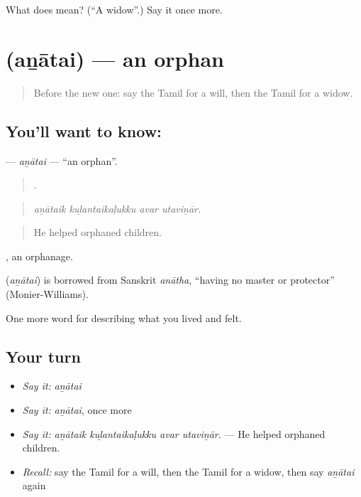 \begin{tcolorbox}[breakable,colback=teal!4,colframe=teal!35!black,title={Before you move on}]
What does  mean? (\textquotedblleft{}A widow\textquotedblright{}.) Say it once more.
\end{tcolorbox}
\section[\texorpdfstring{\ta{அனாதை} (aṉātai)}{அனாதை (aṉātai)}]{ (aṉātai) — an orphan}

\label{lesson:TA-C505-anatai}



\begin{quote}
Before the new one: say the Tamil for a will, then the Tamil for a widow.
\end{quote}

\subsection*{You'll want to know: }
\textbf{} — \emph{aṉātai} — \textquotedblleft{}an orphan\textquotedblright{}.

\begin{quote}
   .
\end{quote}

\begin{quote}
\emph{aṉātaik kuḻantaikaḷukku avar utaviṉār.}
\end{quote}

\begin{quote}
He helped orphaned children.
\end{quote}

 , an orphanage.

\begin{cousinweb}
\textbf{} (\emph{aṉātai}) is borrowed from Sanskrit \emph{anātha}, \textquotedblleft{}having no master or protector\textquotedblright{} (Monier-Williams).
\end{cousinweb}

\begin{grammarlens}[title={What you've built}]
One more word for describing what you lived and felt.
\end{grammarlens}

\subsection*{Your turn}
\begin{itemize}
\raggedright
  \item \emph{Say it:} \emph{aṉātai}
  \item \emph{Say it:} \emph{aṉātai}, once more
  \item \emph{Say it:} \emph{aṉātaik kuḻantaikaḷukku avar utaviṉār.} — He helped orphaned children.
  \item \emph{Recall:} say the Tamil for a will, then the Tamil for a widow, then say \emph{aṉātai} again
\end{itemize}

